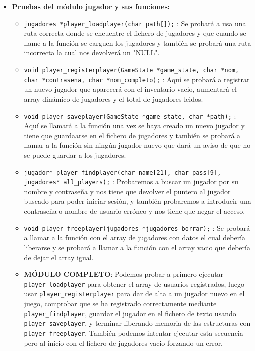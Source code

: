 \begin{itemize}
		\item \textbf{Pruebas del módulo jugador y sus funciones:}
		\begin{itemize}
			\item \verb|jugadores *player_loadplayer(char path[]);| : Se probará a usa una ruta correcta donde se encuentre el 
			fichero de jugadores y que cuando se llame a la función se carguen los jugadores y también se probará una ruta incorrecta
			 la cual nos devolverá un "NULL".
			\item \verb|void player_registerplayer(GameState *game_state, char *nom, char *contrasena, char *nom_completo);| : Aquí se probará 
			a registrar un nuevo jugador que aparecerá con el inventario vacio, aumentará el array dinámico de jugadores y el total de jugadores 
			leidos.
			\item \verb|void player_saveplayer(GameState *game_state, char *path);| : Aquí se llamará a la función una vez se haya creado un nuevo
			 jugador y tiene que guardaarse en el fichero de jugadores y también se probará a llamar a la función sin ningún jugador nuevo que 
			 dará un aviso de que no se puede guardar a los jugadores.
			\item \verb|jugador* player_findplayer(char name[21], char pass[9], jugadores* all_players);| : Probaremos a buscar un jugador por
			su nombre y contraseña y nos tiene que devolver el puntero al jugador buscado para poder iniciar sesión, y también probaremos a 
			introducir una contraseña o nombre de usuario erróneo y nos tiene que negar el acceso.
			\item \verb|void player_freeplayer(jugadores *jugadores_borrar);| : Se probará a llamar a la función con el array de jugadores con
			 datos el cual debería liberarse y se probará a llamar a la función con el array vacio que debería de dejar el array igual.
			\\ \item \textbf{MÓDULO COMPLETO}: Podemos probar a primero ejecutar \texttt{player\_loadplayer} para obtener el array de usuarios registrados, 
			luego usar \texttt{player\_registerplayer} para dar de alta a un jugador nuevo en el juego, comprobar que se ha registrado correctamente mediante 
			\texttt{player\_findplayer}, guardar el jugador en el fichero de texto usando \texttt{player\_saveplayer}, y terminar liberando memoria de las estructuras
			 con \texttt{player\_freeplayer}. También podemos intentar ejecutar esta secuencia pero al inicio con el fichero de jugadores vacio forzando un
			error.
		\end{itemize}

	\end{itemize}

